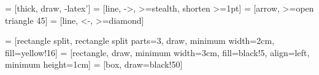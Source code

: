   = [thick, draw, -latex']
 = [line, ->, >=stealth, shorten >=1pt]
 = [arrow, >=open triangle 45]   %
 = [line, <-, >=diamond]           %

 = [rectangle split, rectangle split parts=3, draw, minimum width=2cm, fill=yellow!16] %
 = [rectangle, draw, minimum width=3cm, fill=black!5, align=left, minimum height=1cm]
 = [box, draw=black!50]

